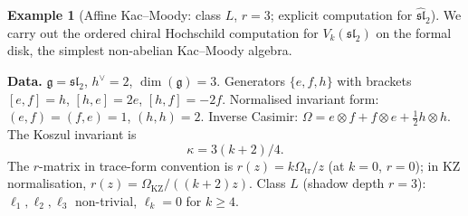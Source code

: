 \documentclass[11pt,reqno]{amsart}
\theoremstyle{definition}
\newtheorem{example}[theorem]{Example}
\theoremstyle{remark}
\newcommand{\fg}{\mathfrak{g}}
\numberwithin{equation}{section}
\begin{document}
\begin{example}[Affine Kac--Moody: class $L$, $r = 3$;
explicit computation for $\widehat{\mathfrak{sl}}_2$]
\label{ex:km}
We carry out the ordered chiral Hochschild computation for
$V_k(\mathfrak{sl}_2)$ on the formal disk, the simplest
non-abelian Kac--Moody algebra.

\smallskip
\noindent\textbf{Data.}
$\fg = \mathfrak{sl}_2$, $h^\vee = 2$, $\dim(\fg) = 3$.
Generators $\{e, f, h\}$ with brackets $[e,f] = h$,
$[h,e] = 2e$, $[h,f] = -2f$.
Normalised invariant form: $(e,f) = (f,e) = 1$,
$(h,h) = 2$. Inverse Casimir:
$\Omega = e \otimes f + f \otimes e
+ \tfrac{1}{2}h \otimes h$.
The Koszul invariant is
\begin{equation}\label{eq:sl2-kappa}
  \kappa = 3(k + 2)/4.
\end{equation}
The $r$-matrix in trace-form convention is
$r(z) = k\Omega_{\mathrm{tr}}/z$ (at $k = 0$, $r = 0$);
in KZ normalisation,
$r(z) = \Omega_{\mathrm{KZ}}/((k + 2)z)$.
Class $L$ (shadow depth $r = 3$): $\ell_1, \ell_2, \ell_3$
non-trivial, $\ell_k = 0$ for $k \geq 4$.


\end{example}
\end{document}
